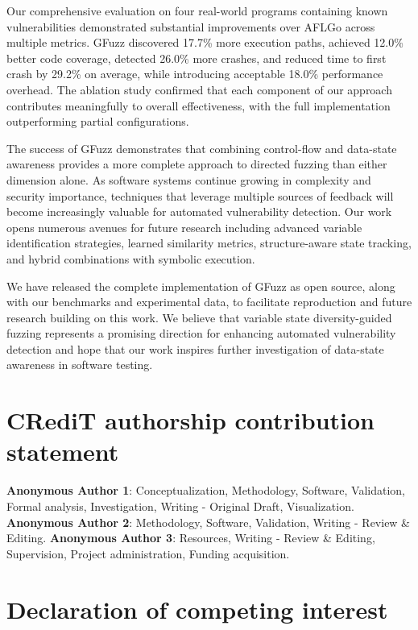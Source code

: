 \documentclass[review]{elsarticle}
\begin{document}
Our comprehensive evaluation on four real-world programs containing known vulnerabilities demonstrated substantial improvements over AFLGo across multiple metrics. GFuzz discovered 17.7\% more execution paths, achieved 12.0\% better code coverage, detected 26.0\% more crashes, and reduced time to first crash by 29.2\% on average, while introducing acceptable 18.0\% performance overhead. The ablation study confirmed that each component of our approach contributes meaningfully to overall effectiveness, with the full implementation outperforming partial configurations.

The success of GFuzz demonstrates that combining control-flow and data-state awareness provides a more complete approach to directed fuzzing than either dimension alone. As software systems continue growing in complexity and security importance, techniques that leverage multiple sources of feedback will become increasingly valuable for automated vulnerability detection. Our work opens numerous avenues for future research including advanced variable identification strategies, learned similarity metrics, structure-aware state tracking, and hybrid combinations with symbolic execution.

We have released the complete implementation of GFuzz as open source, along with our benchmarks and experimental data, to facilitate reproduction and future research building on this work. We believe that variable state diversity-guided fuzzing represents a promising direction for enhancing automated vulnerability detection and hope that our work inspires further investigation of data-state awareness in software testing.

\section*{CRediT authorship contribution statement}

\textbf{Anonymous Author 1}: Conceptualization, Methodology, Software, Validation, Formal analysis, Investigation, Writing - Original Draft, Visualization. \textbf{Anonymous Author 2}: Methodology, Software, Validation, Writing - Review \& Editing. \textbf{Anonymous Author 3}: Resources, Writing - Review \& Editing, Supervision, Project administration, Funding acquisition.

\section*{Declaration of competing interest}
\end{document}
